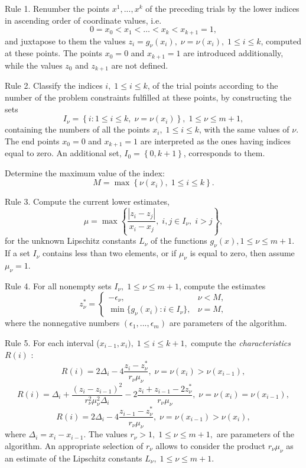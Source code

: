 \documentclass[a4paper]{jpconf}
\begin{document}
Rule 1. Renumber the points $x^1,...,x^k$ of the preceding trials by the
lower indices in ascending order of coordinate values, i.e.
\[
0=x_0<x_1<\dots <x_k<x_{k+1}=1,
\]
and juxtapose to them the values $z_i=g_\nu(x_i), \; \nu=\nu(x_i), \; 1
\leq i \leq k$, computed at these points. The points $x_0=0$ and
$x_{k+1}=1$ are introduced additionally, while the values $z_0$ and
$z_{k+1}$ are not defined.

Rule 2. Classify the indices $i, \; 1 \leq i \leq k$, of the trial points
according to the number of the problem constraints fulfilled at these
points, by constructing the sets
\[
I_\nu =\left\{i:1 \leq i \leq k, \; \nu=\nu(x_i) \right\}, \; 1 \leq \nu \leq m+1,
\]
containing the numbers of all the points $x_i, \; 1 \leq i \leq k$, with
the same values of $\nu$. The end points $x_0=0$ and $x_{k+1}=1$ are
interpreted as the ones having indices equal to zero. An additional set,
$I_0=\left\{0,k+1\right\}$, corresponds to them.

Determine the maximum value of the index:
\[
M=\max\left\{\nu(x_i), \; 1 \leq i \leq k \right \}.
\]

Rule 3. Compute the current lower estimates,
\begin{equation}\label{Rule_Mu}
\mu = \max\left\{ \frac{\left|z_i-z_j\right|}{ x_i - x_j }, \; i,j \in I_\nu, \; i>j \right\},
\end{equation}
for the unknown Lipschitz constants $L_\nu$ of the functions $g_\nu(x),1
\leq \nu \leq m+1$. If a set $I_\nu$ contains less than two elements, or
if $\mu_\nu$ is equal to zero, then assume $\mu_\nu=1$.

Rule 4. For all nonempty sets $I_\nu, \; 1 \leq \nu \leq m+1$, compute the
estimates
\[
z_\nu^\ast = \left\{
   \begin{array}{lr}
     -\epsilon_\nu, & \nu < M,\\
     \min\{ g_\nu(x_i): i\in I_\nu \}, & \nu = M,
   \end{array}
\right.
 \]
where the nonnegative numbers $(\epsilon_1,...,\epsilon_m)$ are parameters
of the algorithm.

Rule 5. For each interval ($x_{i-1},x_i), \; 1 \leq i \leq k+1,$ compute
the \textit{characteristics} $R(i)$ :
\[
R(i)=2\Delta_i-4\frac{z_i-z_\nu^\ast}{r_\nu \mu_\nu}, \; \nu=\nu(x_i)>\nu(x_{i-1}),
\]
\begin{equation}\label{Rule_R}
R(i)=\Delta_i+\frac{(z_i-z_{i-1})^2}{r_\nu^2 \mu_\nu^2\Delta_i}-2\frac{z_i+z_{i-1}-2z_\nu^\ast}{r_\nu \mu_\nu}, \;  \nu=\nu(x_i)=\nu(x_{i-1}),
\end{equation}
\[
R(i)=2\Delta_i-4\frac{z_{i-1}-z_\nu^\ast}{r_\nu \mu_\nu}, \; \nu=\nu(x_{i-1})>\nu(x_i),
\]
where $\Delta_i=x_i - x_{i-1}$. The values $r_\nu > 1, \; 1 \leq
\nu \leq m+1,$ are parameters of the algorithm. An appropriate selection
of $r_\nu$ allows to consider the product $r_\nu \mu_\nu$ as an estimate
of the Lipschitz constants $L_\nu, \; 1 \leq \nu \leq m+1$.
\end{document}

